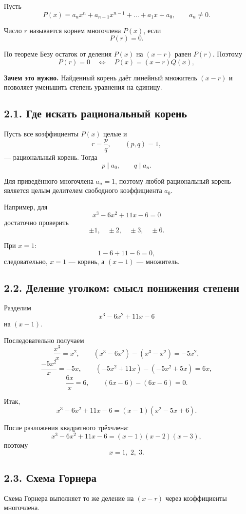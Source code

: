 \documentclass[a4paper,12pt]{article}
\newcommand{\keyidea}[2]{%
  \par\smallskip
  \noindent\textcolor{darkaccent}{\textbf{#1}} #2
  \par\smallskip
}
\begin{document}
Пусть
\[
P(x)
=
a_nx^n
+
a_{n-1}x^{n-1}
+
\dots
+
a_1x
+
a_0,
\qquad
a_n\ne0.
\]

Число $r$ называется корнем многочлена $P(x)$, если
\[
P(r)=0.
\]

По теореме Безу остаток от деления $P(x)$ на $(x-r)$ равен $P(r)$.
Поэтому
\[
P(r)=0
\quad\Longleftrightarrow\quad
P(x)=(x-r)Q(x),
\]

\keyidea{Зачем это нужно.}{
Найденный корень даёт линейный множитель $(x-r)$
и позволяет уменьшить степень уравнения на единицу.
}

\subsection*{2.1. Где искать рациональный корень}

Пусть все коэффициенты $P(x)$ целые и
\[
r=\frac pq,
\qquad
(p,q)=1,
\]
--- рациональный корень.
Тогда
\[
p\mid a_0,
\qquad
q\mid a_n.
\]

Для приведённого многочлена $a_n=1$,
поэтому любой рациональный корень
является целым делителем свободного коэффициента $a_0$.

Например, для
\[
x^3-6x^2+11x-6=0
\]
достаточно проверить
\[
\pm1,\quad
\pm2,\quad
\pm3,\quad
\pm6.
\]

При $x=1$:
\[
1-6+11-6=0,
\]
следовательно, $x=1$ --- корень,
а $(x-1)$ --- множитель.

\subsection*{2.2. Деление уголком: смысл понижения степени}

Разделим
\[
x^3-6x^2+11x-6
\]
на $(x-1)$.

Последовательно получаем
\[
\frac{x^3}{x}=x^2,
\qquad
(x^3-6x^2)-(x^3-x^2)=-5x^2,
\]
\[
\frac{-5x^2}{x}=-5x,
\qquad
(-5x^2+11x)-(-5x^2+5x)=6x,
\]
\[
\frac{6x}{x}=6,
\qquad
(6x-6)-(6x-6)=0.
\]

Итак,
\[
x^3-6x^2+11x-6
=
(x-1)(x^2-5x+6).
\]

После разложения квадратного трёхчлена:
\[
x^3-6x^2+11x-6
=
(x-1)(x-2)(x-3),
\]
поэтому
\[
\boxed{x=1,\;2,\;3}.
\]

\subsection*{2.3. Схема Горнера}

Схема Горнера выполняет то же деление на $(x-r)$
через коэффициенты многочлена.
\end{document}

